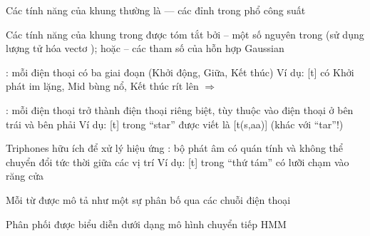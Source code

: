 \documentclass{article}
\begin{document}
\begin{huge}
\vspace*{0.2in}

\textwidth
{}

Các tính năng của khung thường là  --- các đỉnh trong phổ công suất








Các tính năng của khung trong  được tóm tắt bởi \al
  -- một số nguyên trong \mat{$[0\ldots 255]$} (sử dụng lượng tử hóa vectơ ); hoặc \al
  -- các tham số của hỗn hợp Gaussian

: mỗi điện thoại có ba giai đoạn (Khởi động, Giữa, Kết thúc)\al
 Ví dụ: [t] có Khởi phát im lặng, Mid bùng nổ, Kết thúc rít lên \al
 $\Rightarrow$ 

: mỗi điện thoại trở thành  điện thoại riêng biệt,
tùy thuộc vào điện thoại ở bên trái và bên phải\al
  Ví dụ: [t] trong ``star'' được viết là [t(s,aa)] (khác với ``tar''!)

Triphones hữu ích để xử lý hiệu ứng : bộ phát âm
có quán tính và không thể chuyển đổi tức thời giữa các vị trí\al
Ví dụ: [t] trong ``thứ tám'' có lưỡi chạm vào răng cửa


\vspace*{0.2in}

\textwidth
{}






Mỗi từ được mô tả như một sự phân bố qua các chuỗi điện thoại

Phân phối được biểu diễn dưới dạng mô hình chuyển tiếp HMM

\vspace*{0.2in}

\textwidth
{}



\end{huge}
\end{document}
